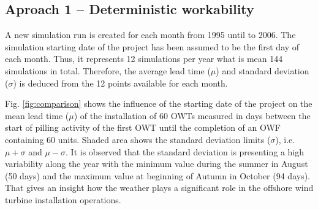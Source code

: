 \subsection{Aproach 1 -- Deterministic workability}

A new simulation run is created for each month from 1995 until to 2006. The simulation starting date of the project has been assumed to be the first day of each month. Thus, it represents 12 simulations per year what is mean 144 simulations in total. Therefore, the average lead time ($\mu$) and standard deviation ($\sigma$) is deduced from the 12 points available for each month.

Fig. \ref{fig:comparison} shows the influence of the starting date of the project on the mean lead time ($\mu$) of the installation of 60 OWTs measured in days between the start of pilling activity of the first OWT until the completion of an OWF containing 60 units. Shaded area shows the standard deviation limits ($\sigma$), i.e. $\mu + \sigma$ and $\mu - \sigma$. It is observed that the standard deviation is presenting a high variability along the year with the minimum value during the summer in August (50 days) and the maximum value at beginning of Autumn in October (94 days). That gives an insight how the weather plays a significant role in the offshore wind turbine installation operations.